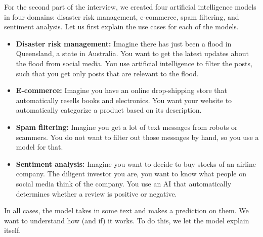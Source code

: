 \documentclass{article}
\theoremstyle{definition}
\theoremstyle{remark}
\begin{document}
For the second part of the interview, we created four artificial intelligence models in four domains: disaster risk management, e-commerce, spam filtering, and sentiment analysis. Let us first explain the use cases for each of the models.\\
\begin{itemize}
    \item \textbf{Disaster risk management:} Imagine there has just been a flood in Queensland, a state in Australia. You want to get the latest updates about the flood from social media. You use artificial intelligence to filter the posts, such that you get only posts that are relevant to the flood.
    \item \textbf{E-commerce:} Imagine you have an online drop-shipping store that automatically resells books and electronics. You want your website to automatically categorize a product based on its description.
    \item \textbf{Spam filtering:} Imagine you get a lot of text messages from robots or scammers. You do not want to filter out those messages by hand, so you use a model for that.
    \item \textbf{Sentiment analysis:} Imagine you want to decide to buy stocks of an airline company. The diligent investor you are, you want to know what people on social media think of the company. You use an AI that automatically determines whether a review is positive or negative.
\end{itemize}

In all cases, the model takes in some text and makes a prediction on them. We want to understand how (and if) it works. To do this, we let the model explain itself. 

\\\\
\end{document}

